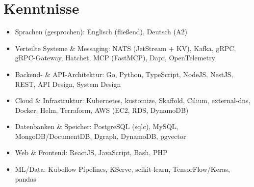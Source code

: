\documentclass[10pt,a4paper]{resume}
\begin{document}
\section{Kenntnisse}

\begin{itemize}[leftmargin=1.4em,nosep,topsep=2pt]
  \item Sprachen (gesprochen): Englisch (fließend), Deutsch (A2)
  \item Verteilte Systeme \& Messaging: NATS (JetStream + KV), Kafka, gRPC, gRPC-Gateway, Hatchet, MCP (FastMCP), Dapr, OpenTelemetry
  \item Backend- \& API-Architektur: Go, Python, TypeScript, NodeJS, NestJS, REST, API Design, System Design
  \item Cloud \& Infrastruktur: Kubernetes, kustomize, Skaffold, Cilium, external-dns, Docker, Helm, Terraform, AWS (EC2, RDS, DynamoDB)
  \item Datenbanken \& Speicher: PostgreSQL (sqlc), MySQL, MongoDB/DocumentDB, Dgraph, DynamoDB, pgvector
  \item Web \& Frontend: ReactJS, JavaScript, Bash, PHP
  \item ML/Data: Kubeflow Pipelines, KServe, scikit-learn, TensorFlow/Keras, pandas
\end{itemize}
\end{document}
